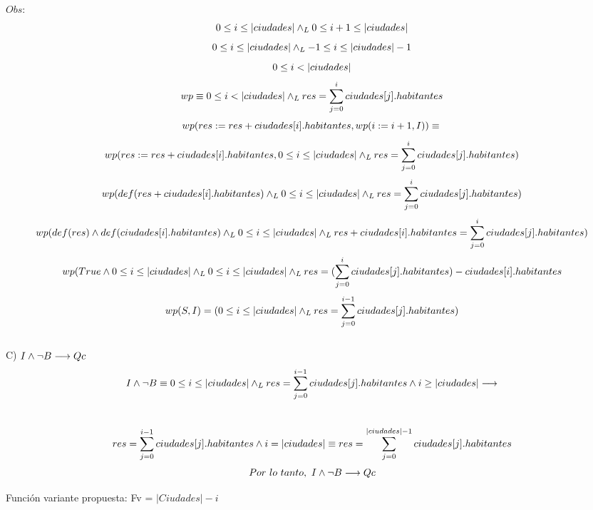 \documentclass[10pt,a4paper]{article}
\begin{document}
$Obs:$\\ 
\[0 \leq i \leq |ciudades| \land _L 0 \leq i+1 \leq |ciudades|\\  \]
\[0 \leq i \leq |ciudades| \land _L -1 \leq i \leq |ciudades|-1\\\]
\[0 \leq i < |ciudades|\\ \]
\[
wp \equiv 0 \leq i < |ciudades| \land _L res = \sum\limits_{j=0}^{i}ciudades[j].habitantes\\\]
\[wp(res := res + ciudades[i].habitantes, wp(i := i+1, I)) \equiv \\\]
\[wp(res := res + ciudades[i].habitantes, 0 \leq i \leq |ciudades| \land _L res = {\sum\limits_{j=0}^{i}ciudades[j].habitantes})\]
\[wp(def(res+ciudades[i].habitantes) \land _L 0 \leq i \leq |ciudades| \land _L res = {\sum\limits_{j=0}^{i}ciudades[j].habitantes})\]
\[wp(def(res) \land def(ciudades[i].habitantes) \land _L 0 \leq i \leq |ciudades| \land _L res+ciudades[i].habitantes = {\sum\limits_{j=0}^{i}ciudades[j].habitantes})\]
\[wp(True \land 0 \leq i \leq |ciudades| \land _L 0 \leq i \leq |ciudades| \land _L res = ({\sum\limits_{j=0}^{i}ciudades[j].habitantes})-ciudades[i].habitantes\]
\[wp(S,I)=(0 \leq i \leq |ciudades| \land _L res = {\sum\limits_{j=0}^{i-1}ciudades[j].habitantes})\\\]
\vspace{0.5cm}\\	

C) $I \land \neg B \longrightarrow Qc$\\
\[I \land \neg B \equiv 0 \leq i \leq |ciudades| \land _L res ={\sum\limits_{j=0}^{i-1}ciudades[j].habitantes} \land i \geq |ciudades|\longrightarrow\]\\
\[res = {\sum\limits_{j=0}^{i-1}ciudades[j].habitantes} \land i = |ciudades| \equiv res= {\sum\limits_{j=0}^{|ciudades|-1}ciudades[j].habitantes}\\ \\\]
\[Por \ lo \ tanto, \ I\land \neg B \implica Qc\\ \vspace{0.5cm}\\\]

Función variante propuesta: Fv = $|Ciudades|-i$ \\
\end{document}
